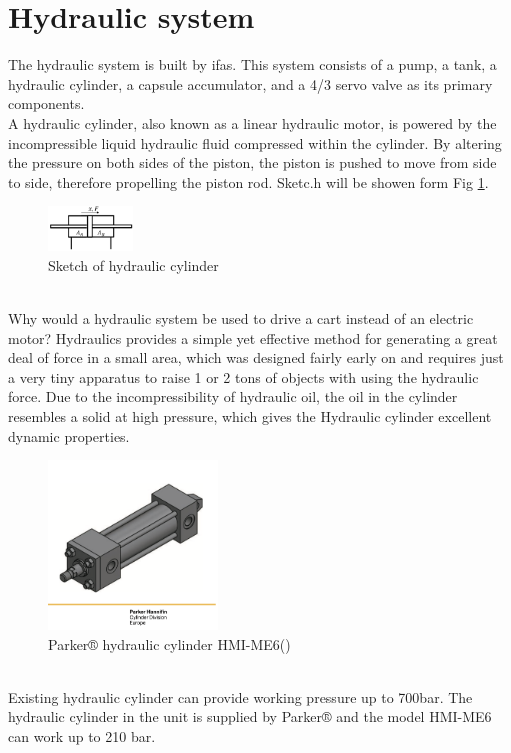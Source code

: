 \section{Hydraulic system}
\label{sec:Hydsys}
The hydraulic system is built by ifas. This system consists of a pump, a tank, 
a hydraulic cylinder, a capsule accumulator, and a 4/3 servo valve as its primary components. \\
A hydraulic cylinder, also known as a linear hydraulic motor, is powered by the                                                                                             
incompressible liquid hydraulic fluid compressed within the cylinder. 
By altering the pressure on both sides of the piston, the piston is pushed to move from 
side to side, therefore propelling the piston rod. Sketc.h will be showen form Fig \ref*{fig:hydcylinder}.\\
\begin{figure}[htbp]
  \centering
  \includegraphics[width = 0.2\textwidth]{Contents/Resources/hydcylinder.jpeg}
  \caption[Hydraulic cylinder sketch]{Sketch of hydraulic cylinder}
  \label{fig:hydcylinder}
\end{figure}\\
Why would a hydraulic system be used to drive a cart instead of an electric motor? 
Hydraulics provides a simple yet effective method for generating a great deal of force 
in a small area, which was designed fairly early on and requires 
just a very tiny apparatus to raise 1 or 2 tons of objects with using the hydraulic force. 
Due to the incompressibility of hydraulic oil, the oil in the cylinder resembles a 
solid at high pressure, which gives the Hydraulic cylinder excellent dynamic properties.\\
\begin{figure}[htbp]
  \centering
  \includegraphics[width = 0.4\textwidth]{Contents/Resources/Parker Hydcylinder.png}
  \caption[Parker® Hydraulic cylinder]{Parker® hydraulic cylinder HMI-ME6(\cite[]{parker})}
  \label{fig:Parker}
\end{figure}\\
Existing hydraulic cylinder can provide working pressure up to 700bar. The hydraulic
cylinder in the unit is supplied by Parker® and the model HMI-ME6 can work up to 210 bar.
